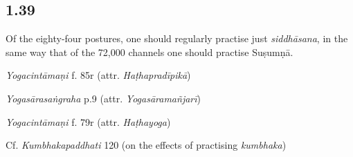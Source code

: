 \begin{ekdosis}
\begin{philcomm}[hp01_038]
\end{philcomm}

\subsection*{1.39}
\begin{translation}[hp01_039]
Of the eighty-four postures, one should regularly practise just \emph{siddhāsana}, in the same way that of the 72,000 channels one should practise Suṣumṇā.
\end{translation}


\begin{testimonia}[hp01_039]
\emph{Yogacintāmaṇi} f. 85r (attr. \emph{Haṭhapradīpikā})

\begin{versinnote}
\end{versinnote}

\emph{Yogasārasaṅgraha} p.9 (attr. \emph{Yogasāramañjarī})

\begin{versinnote}
\end{versinnote}

\emph{Yogacintāmaṇi} f. 79r (attr. \emph{Haṭhayoga})

\begin{versinnote}
\end{versinnote}

Cf. \emph{Kumbhakapaddhati} 120 (on the effects of practising \emph{kumbhaka})

\begin{versinnote}
\end{versinnote}


\end{testimonia}
\end{ekdosis}
